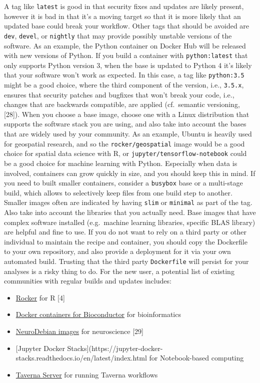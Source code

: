 \documentclass[10pt,letterpaper]{article}
\providecommand{\tightlist}{%
  \setlength{\itemsep}{0pt}\setlength{\parskip}{0pt}}
\begin{document}
A tag like \texttt{latest} is good in that security fixes and updates
are likely present, however it is bad in that it's a moving target so
that it is more likely that an updated base could break your workflow.
Other tags that should be avoided are \texttt{dev}, \texttt{devel}, or
\texttt{nightly} that may provide possibly unstable versions of the
software. As an example, the Python container on Docker Hub will be
released with new versions of Python. If you build a container with
\texttt{python:latest} that only supports Python version 3, when the
base is updated to Python 4 it's likely that your software won't work as
expected. In this case, a tag like \texttt{python:3.5} might be a good
choice, where the third component of the version, i.e., \texttt{3.5.x},
ensures that security patches and bugfixes that won't break your code,
i.e., changes that are backwards compatible, are applied (cf.~semantic
versioning, {[}28{]}). When you choose a base image, choose one with a
Linux distribution that supports the software stack you are using, and
also take into account the bases that are widely used by your community.
As an example, Ubuntu is heavily used for geospatial research, and so
the \texttt{rocker/geospatial} image would be a good choice for spatial
data science with R, or \texttt{jupyter/tensorflow-notebook} could be a
good choice for machine learning with Python. Especially when data is
involved, containers can grow quickly in size, and you should keep this
in mind. If you need to built smaller containers, consider a
\texttt{busybox} base or a multi-stage build, which allows to
selectively keep files from one build step to another. Smaller images
often are indicated by having \texttt{slim} or \texttt{minimal} as part
of the tag. Also take into account the libraries that you actually need.
Base images that have complex software installed (e.g.~machine learning
libraries, specific BLAS library) are helpful and fine to use. If you do
not want to rely on a third party or other individual to maintain the
recipe and container, you should copy the Dockerfile to your own
repository, and also provide a deployment for it via your own automated
build. Trusting that the third party \texttt{Dockerfile} will persist
for your analyses is a risky thing to do. For the new user, a potential
list of existing communities with regular builds and updates includes:

\begin{itemize}
\tightlist
\item
  \href{https://www.rocker-project.org/}{Rocker} for R {[}4{]}
\item
  \href{https://bioconductor.org/help/docker/}{Docker containers for
  Bioconductor} for bioinformatics
\item
  \href{https://hub.docker.com/_/neurodebian}{NeuroDebian images} for
  neuroscience {[}29{]}
\item
  {[}Jupyter Docker
  Stacks{]}(https://jupyter-docker-stacks.readthedocs.io/en/latest/index.html
  for Notebook-based computing
\item
  \href{https://hub.docker.com/r/taverna/taverna-server}{Taverna Server}
  for running Taverna workflows
\end{itemize}
\end{document}

